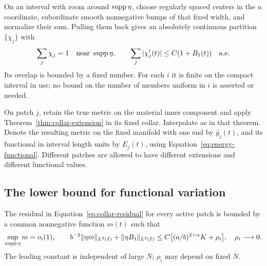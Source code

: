 On an interval with room around $\operatorname{supp}\eta$, choose regularly spaced
centers in the $u$ coordinate, subordinate smooth nonnegative bumps
of that fixed width, and normalize their sum.  Pulling them back gives
an absolutely continuous partition $\{\chi_j\}$ with
\begin{equation}\label{final:partition}
 \sum_j\chi_j=1\quad\hbox{near }\operatorname{supp}\eta,\qquad
 \sum_j|\chi_j'(t)|\le C(1+B_1(t))\quad\hbox{a.e.}
\end{equation}
Its overlap is bounded by a fixed number.  For each $i$ it is finite
on the compact interval in use; no bound on the number of members
uniform in $i$ is asserted or needed.

On patch $j$, retain the true metric on the material inner component
and apply Theorem~\ref{thm:collar-extension} in its fixed collar.
Interpolate as in that theorem.  Denote the resulting metric on the
fixed manifold with one end by $\hat g_j(t)$, and its functional in
interval length units by $E_j(t)$, using
Equation~\eqref{eq:energy-functional}.  Different patches are allowed
to have different extensions and different functional values.

\subsection{The lower bound for functional variation}

\begin{lemma}
\label{final:collar-bound}
The residual in Equation~\eqref{eq:collar-residual} for every active
patch is bounded by a common nonnegative function $m(t)$ such that
\begin{equation}\label{eq:collar-time-bound}
 \sup_{\operatorname{supp}\eta}m=o_i(1),\qquad
 b^{-2}\|\eta m\|_{L^2(I)}+\|\eta B_1\|_{L^2(I)}
 \le C\bigl[(a/b)^{2+\alpha}K+\rho_i\bigr],
 \quad \rho_i\longrightarrow0.
\end{equation}
The leading constant is independent of large $N$; $\rho_i$ may depend
on fixed $N$.
\end{lemma}

